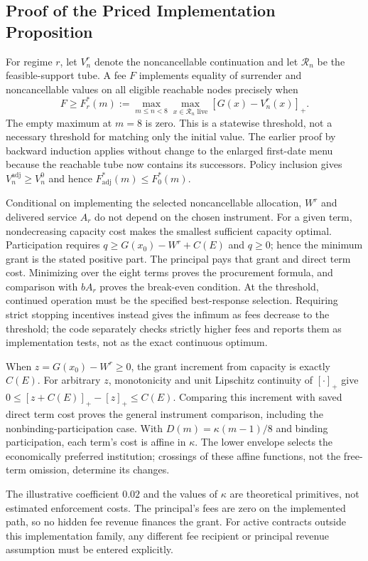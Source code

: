 \subsection{Proof of the Priced Implementation Proposition}
For regime $r$, let $V^r_n$ denote the noncancellable continuation and let $\mathcal R_n$ be the feasible-support tube. A fee $F$ implements equality of surrender and noncancellable values on all eligible reachable nodes precisely when
\[
 F\geq F_r^*(m):=\max_{m\leq n<8}\max_{x\in\mathcal R_n\text{ live}}[G(x)-V^r_n(x)]_+.
\]
The empty maximum at $m=8$ is zero. This is a statewise threshold, not a necessary threshold for matching only the initial value. The earlier proof by backward induction applies without change to the enlarged first-date menu because the reachable tube now contains its successors. Policy inclusion gives $V^{\mathrm{adj}}_n\geq V^0_n$ and hence $F_{\mathrm{adj}}^*(m)\leq F_0^*(m)$.

Conditional on implementing the selected noncancellable allocation, $W^r$ and delivered service $A_r$ do not depend on the chosen instrument. For a given term, nondecreasing capacity cost makes the smallest sufficient capacity optimal. Participation requires
$q\geq G(x_0)-W^r+C(E)$ and $q\geq0$; hence the minimum grant is the stated positive part. The principal pays that grant and direct term cost. Minimizing over the eight terms proves the procurement formula, and comparison with $bA_r$ proves the break-even condition. At the threshold, continued operation must be the specified best-response selection. Requiring strict stopping incentives instead gives the infimum as fees decrease to the threshold; the code separately checks strictly higher fees and reports them as implementation tests, not as the exact continuous optimum.

When $z=G(x_0)-W^r\geq0$, the grant increment from capacity is exactly $C(E)$. For arbitrary $z$, monotonicity and unit Lipschitz continuity of $[\cdot]_+$ give
$0\leq[z+C(E)]_+-[z]_+\leq C(E)$. Comparing this increment with saved direct term cost proves the general instrument comparison, including the nonbinding-participation case. With $D(m)=\kappa(m-1)/8$ and binding participation, each term's cost is affine in $\kappa$. The lower envelope selects the economically preferred institution; crossings of these affine functions, not the free-term omission, determine its changes.

The illustrative coefficient $0.02$ and the values of $\kappa$ are theoretical primitives, not estimated enforcement costs. The principal's fees are zero on the implemented path, so no hidden fee revenue finances the grant. For active contracts outside this implementation family, any different fee recipient or principal revenue assumption must be entered explicitly.

